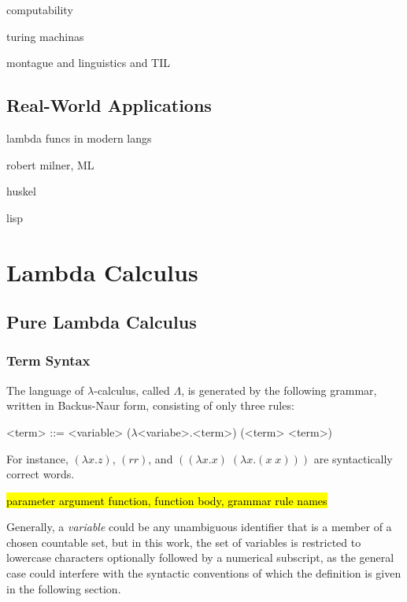 \documentclass[a4paper,10pt]{article}
\begin{document}
computability

turing machinas

montague and linguistics and TIL

\subsection{Real-World Applications}

lambda funcs in modern langs

robert milner, ML

huskel

lisp

\section{Lambda Calculus}
\subsection{Pure Lambda Calculus}

\subsubsection{Term Syntax}
The language of $\lambda$-calculus, called $\Lambda$, is generated by the following
grammar, written in Backus-Naur form, consisting of only three rules:
\setlength{\grammarindent}{5.2em}
\begin{grammar}
<term> ::= <variable> 
\alt ($\lambda$<variabe>.<term>) 
\alt (<term> <term>) 
\end{grammar}
For instance, $(\lambda x.z)$, $(rr)$, and $((\lambda x.x)\;(\lambda x.(x\;x)))$ are syntactically correct words.

\hl{parameter argument function, function body, grammar rule names }

Generally, a \textit{variable} could be any unambiguous identifier 
that is a member of a chosen countable set, but in this work, the set
of variables is restricted to
lowercase characters optionally followed by a numerical subscript,
as the general case could interfere with the syntactic conventions
of which the definition is given in the following section.
\end{document}
